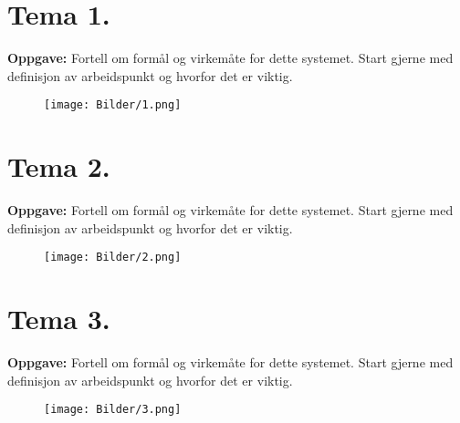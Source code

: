 \documentclass[a4paper,11pt,norsk]{article}
\begin{document}


\newpage

\newpage
\section{Tema 1.}
\begin{question}
    \textbf{Oppgave:}
        Fortell om formål og virkemåte for dette systemet. Start gjerne med definisjon av arbeidspunkt
        og hvorfor det er viktig.

        \begin{figure}[H]
            \centering 
            \texttt{[image: Bilder/1.png]}
        \end{figure}
\end{question}

\newpage
\section{Tema 2.}
\begin{question}
    \textbf{Oppgave:}
        Fortell om formål og virkemåte for dette systemet. Start gjerne med definisjon av arbeidspunkt
        og hvorfor det er viktig.

        \begin{figure}[H]
            \centering 
            \texttt{[image: Bilder/2.png]}
        \end{figure}
\end{question}

\newpage
\section{Tema 3.}
\begin{question}
    \textbf{Oppgave:}
        Fortell om formål og virkemåte for dette systemet. Start gjerne med definisjon av arbeidspunkt
        og hvorfor det er viktig.
        
        \begin{figure}[H]
            \centering 
            \texttt{[image: Bilder/3.png]}
        \end{figure}
\end{question}

\newpage
\end{document}
